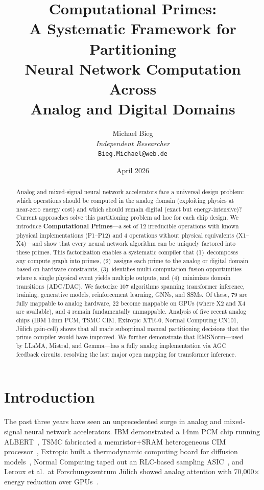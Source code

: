 \documentclass[11pt]{article}
\title{Computational Primes:\\A Systematic Framework for Partitioning\\Neural Network Computation Across\\Analog and Digital Domains}
\author{Michael Bieg\\
\textit{Independent Researcher}\\
\texttt{Bieg.Michael@web.de}}
\date{April 2026}
\begin{document}
\maketitle

\begin{abstract}
Analog and mixed-signal neural network accelerators face a universal design problem: which operations should be computed in the analog domain (exploiting physics at near-zero energy cost) and which should remain digital (exact but energy-intensive)? Current approaches solve this partitioning problem ad hoc for each chip design. We introduce \textbf{Computational Primes}---a set of 12 irreducible operations with known physical implementations (P1--P12) and 4 operations without physical equivalents (X1--X4)---and show that every neural network algorithm can be uniquely factored into these primes. This factorization enables a systematic compiler that (1)~decomposes any compute graph into primes, (2)~assigns each prime to the analog or digital domain based on hardware constraints, (3)~identifies multi-computation fusion opportunities where a single physical event yields multiple outputs, and (4)~minimizes domain transitions (ADC/DAC). We factorize 107 algorithms spanning transformer inference, training, generative models, reinforcement learning, GNNs, and SSMs. Of these, 79 are fully mappable to analog hardware, 22 become mappable on GPUs (where X2 and X4 are available), and 4 remain fundamentally unmappable. Analysis of five recent analog chips (IBM 14nm PCM, TSMC CIM, Extropic XTR-0, Normal Computing CN101, J\"ulich gain-cell) shows that all made suboptimal manual partitioning decisions that the prime compiler would have improved. We further demonstrate that RMSNorm---used by LLaMA, Mistral, and Gemma---has a fully analog implementation via AGC feedback circuits, resolving the last major open mapping for transformer inference.
\end{abstract}

\section{Introduction}

The past three years have seen an unprecedented surge in analog and mixed-signal neural network accelerators. IBM demonstrated a 14nm PCM chip running ALBERT~\cite{ibm2025}, TSMC fabricated a memristor+SRAM heterogeneous CIM processor~\cite{tsmc2025}, Extropic built a thermodynamic computing board for diffusion models~\cite{extropic2025}, Normal Computing taped out an RLC-based sampling ASIC~\cite{normal2025}, and Leroux et al.\ at Forschungszentrum J\"ulich showed analog attention with 70,000$\times$ energy reduction over GPUs~\cite{leroux2025a}.
\end{document}
